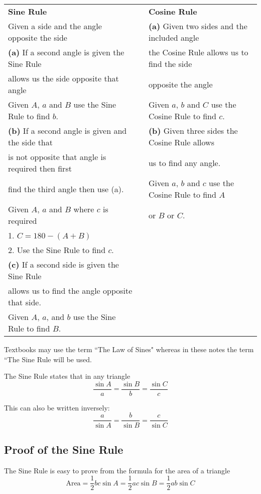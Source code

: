 \begin{tabular}[c]{lll}\textbf{Sine Rule}  &  & \textbf{Cosine
		Rule}  \\
	Given a side and the angle opposite the side  &  & \textbf{(a)}
	Given two sides and the included angle  \\
	\textbf{(a)} If a second angle is
	given the Sine Rule  &  & the Cosine Rule allows us to find the
	side  \\
	allows us the side opposite that angle  &  & opposite
	the angle  \\
	Given $A$, $a$ and $B$ use the Sine Rule to find $b\text{.}$  &  & Given $a$, $b$ and $C$ use the Cosine Rule to find $c\text{.}$  \\
	\textbf{(b)} If a second
	angle is given and the side that  &  & \textbf{(b)} Given three
	sides the Cosine Rule allows  \\
	is not opposite that angle is required then first  &  & us
	to find any angle.  \\
	find the third angle then use (a).  &  & Given
	$a$, $b$ and $c$ use the Cosine Rule to find $A$  \\
	Given $A$, $a$ and $B$ where $c$ is required  &  & or $B$ or $C$.  \\
	1. $C =180 -(A +B)$  &  &  \\
	2.
	Use the Sine Rule to find $c$.  &  &  \\
	\textbf{(c)} If a second side is given the Sine Rule  &  &  \\
	allows
	us to find the angle opposite that side.  &  &  \\
	Given
	$A$, $a$, and $b$ use the Sine Rule to find $B$.  &  &  \\
\end{tabular}

Textbooks may use the term ``The Law of Sines" whereas in these notes the term ``The Sine Rule will be used. 

\begin{tcolorbox}
	The Sine Rule states that in any triangle
	\begin{equation*}\frac{\sin  A}{a} =\frac{\sin  B}{b} =\frac{\sin  C}{c}
	\end{equation*}\end{tcolorbox}
This can also be written inversely:
\begin{equation*}\frac{a}{\sin  A} =\frac{b}{\sin  B} =\frac{c}{\sin  C}
\end{equation*}

\subsection*{Proof of the Sine Rule}
The Sine Rule is easy to prove from the formula for the area of a triangle
\begin{equation*}\text{Area} =\frac{1}{2} b c \sin  A =\frac{1}{2} a c \sin  B =\frac{1}{2} a b \sin  C
\end{equation*}

